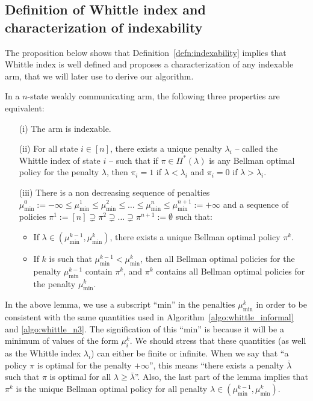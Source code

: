 \subsection{Definition of Whittle index and characterization of indexability}

The proposition below shows that Definition~\ref{defn:indexability} implies that Whittle index is well defined and proposes a characterization of any indexable arm, that we will later use to derive our algorithm. 
\begin{lem}
    \label{lem:indexable}
    In a $n$-state weakly communicating arm, the following three properties are equivalent: 
    \begin{enumerate}
        \item[(i)] The arm is indexable.
        \item[(ii)] For all state $i\in[n]$, there exists a unique penalty $\lambda_i$ -- called the Whittle index of state $i$ -- such that if $\pi\in\Pi^*(\lambda)$ is any Bellman optimal policy for the penalty $\lambda$, then $\pi_i=1$ if $\lambda<\lambda_i$ and $\pi_i=0$ if $\lambda>\lambda_i$. 
        \item[(iii)] There is a non decreasing sequence of penalties $\mu_{\min}^0:=-\infty\le\mu^1_{\min}\le\mu^2_{\min}\le\dots\le\mu^n_{\min}\le\mu^{n+1}_{\min}:=+\infty$ and a sequence of policies $\pi^1:=[n]\supsetneq\pi^2\supsetneq\dots\supsetneq\pi^{n+1}:=\emptyset$ such that:
        \begin{itemize}
            \item If $\lambda\in(\mu^{k-1}_{\min},\mu^{k}_{\min})$, there exists a unique Bellman optimal policy $\pi^{k}$.
            \item If $k$ is such that $\mu^{k-1}_{\min}<\mu^{k}_{\min}$, then all Bellman optimal policies for the penalty $\mu^{k-1}_{\min}$ contain $\pi^{k}$, and $\pi^k$ contains all Bellman optimal policies for the penalty $\mu^k_{\min}$.
        \end{itemize}
    \end{enumerate}
\end{lem}

In the above lemma, we use a subscript ``min'' in the penalties $\mu^{k}_{\min}$ in order to be consistent with the same quantities used in Algorithm~\ref{algo:whittle_informal} and \ref{algo:whittle_n3}.  The signification of this ``min'' is because it will be a minimum of values of the form $\mu^k_i$.  We should stress that these quantities (as well as the Whittle index $\lambda_i$) can either be finite or infinite. When we say that ``a policy $\pi$ is optimal for the penalty $+\infty$'', this means ``there exists a penalty $\bar{\lambda}$ such that $\pi$ is optimal for all $\lambda\ge\bar{\lambda}$''.  Also, the last part of the lemma implies that $\pi^k$ is the unique Bellman optimal policy for all penalty $\lambda\in(\mu^{k-1}_{\min}, \mu^{k}_{\min})$.

